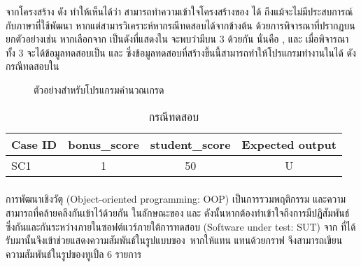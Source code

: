 {{จากโครงสร้าง{\sourcecode} ดัง{} ทำให้เห็นได้ว่า {\tester}สามารถทำความเข้าใจโครงสร้างของ{\sourcecode} ได้ 
ถึงแม้{\tester}จะไม่มีประสบการณ์กับภาษาที่ใช้พัฒนา หากแต่{\tester}สามารวิเคราะห์หากรณีทดสอบได้จาก{\cfg}ข้างต้น 
ด้วยการพิจารณา{\PredicateNode}ที่ปรากฏบน{\FirstTimeDefine{\TestPath}{\TestPathEN}} ยกตัวอย่างเช่น 
หากเลือก{\Path}จาก{} เป็น{\TestPath}ดังที่แสดงใน{} จะพบว่ามี{\PredicateNode}บน{\TestPath} 3 {\Node} 
ด้วยกัน นั่นคือ ,  และ  เมื่อพิจารณา{\PredicateNode}ทั้ง 3 {\Node}จะได้ข้อมูลทดสอบเป็น  และ 
 ซึ่งข้อมูลทดสอบที่สร้างขึ้นนี้สามารถทำให้โปรแกรมทำงานใน{\TestPath}ได้ 
ดังกรณีทดสอบใน

\clearpage
\begin{figure}[ht!]
    \centering
    \caption{ตัวอย่าง{\TestPath}สำหรับโปรแกรมคำนวณเกรด}
    \label{fig:testpath}
\end{figure}


\begin{table}[ht!]
    \centering
    \caption{กรณีทดสอบ}
    \label{tab:simpleTestCase}
    \begin{tabular}{|l|c|c|c|}
        \hline
        \rowcolor{LightGray}
        Case ID     & bonus\_score  & student\_score    & Expected output \\
        \hline
        SC1         & 1             & 50                & U \\
        \hline
    \end{tabular}
\end{table}

\subsubsection{\FirstTimeDefine{\scg}{\scgEN}}

การพัฒนา{\software}เชิงวัตุ (Object-oriented programming: OOP) เป็นการรวมพฤติกรรม และความสามารถที่คล้ายคลึงกันเข้าไว้ด้วยกัน \cite{kindler2011}
ในลักษณะของ\FirstTimeDefine{\class}{\classEN} \FirstTimeDefine{\method}{\methodEN} และ \FirstTimeDefine{\attribute}{\attributeEN} 
ดังนั้นหากต้องทำเข้าใจถึงการมีปฏิสัมพันธ์ซึ่งกันและกันระหว่าง{\class}ภายในซอฟต์แวร์ภายใต้การทดสอบ (Software under test: SUT) จาก{\sourcecode} 
ที่ได้รับมานั้น{\scg}จึงเข้าช่วยแสดงความสัมพันธ์ในรูปแบบของ\FirstTimeDefine{\DirectedMultiGraph}{\DirectedMultiGraphEN}\ หากให้แทน{\software}  
แทนด้วยกราฟ  จึงสามารถเขียนความสัมพันธ์ในรูปของทูเปิ้ล 6 รายการ 

}}
